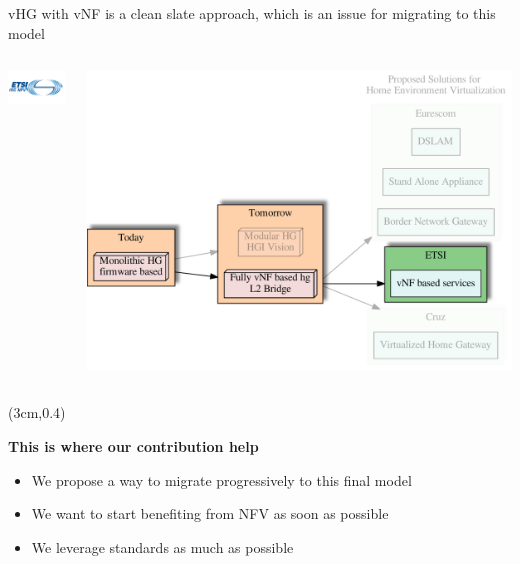 \documentclass[a4paper]{beamer}
\begin{document}
\begin{frame}{vHG with vNF is a clean slate approach, which is an issue for migrating to this model}
	\begin{columns}[T]
		\begin{column}[T]{0.33 \textwidth} 
			\vspace{6em}
			\includegraphics[width=10em]{etsinfv.png}
		\end{column}
										
		\begin{column}[T]{0.66\textwidth} 
										   
			\includegraphics[width=\textwidth]{vhgtrends-etsi-emphasis.pdf}
																																						
		\end{column}
																										
	\end{columns}
	\begin{textblock*}{8cm}(3cm,0.4\textheight)
		\begin{block}{}
			\textbf{ This is where our contribution help }
			\begin{itemize}
				\item We propose a way to migrate progressively to this final model
				\item We want to start benefiting from NFV as soon as possible
				\item We leverage standards as much as possible
			\end{itemize}
		\end{block}
	\end{textblock*}		
\end{frame}
\end{document}
